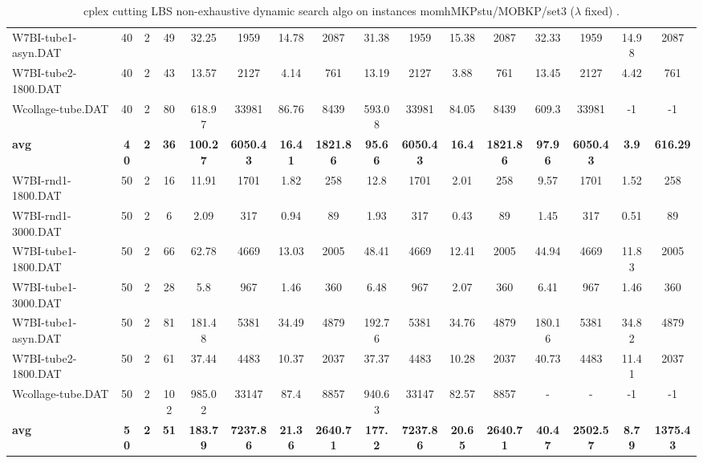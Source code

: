 \begin{sidewaystable}[!ht]
{\begin{tabular}{lccccccccccccccc}
W7BI-tube1-asyn.DAT & 40 & 2 & 49 & 32.25 & 1959 &  \textcolor{blue2}{14.78} & 2087 & 31.38 & 1959 & 15.38 & 2087 & 32.33 & 1959 & 14.98 & 2087 \\
W7BI-tube2-1800.DAT & 40 & 2 & 43 & 13.57 & 2127 & 4.14 & 761 & 13.19 & 2127 &  \textcolor{blue2}{3.88} & 761 & 13.45 & 2127 & 4.42 & 761 \\
Wcollage-tube.DAT & 40 & 2 & 80 & 618.97 & 33981 & 86.76 & 8439 & 593.08 & 33981 &  \textcolor{blue2}{84.05} & 8439 & 609.3 & 33981 & -1 & -1 \\
\cline{1-16} \textbf{avg} & \textbf{40} & \textbf{2} & \textbf{36} & \textbf{100.27} & \textbf{6050.43} & \textbf{16.41} & \textbf{1821.86} & \textbf{95.66} & \textbf{6050.43} & \textbf{16.4} & \textbf{1821.86} & \textbf{97.96} & \textbf{6050.43} & \textbf{3.9} & \textbf{616.29} \\ \cline{1-16}
W7BI-rnd1-1800.DAT & 50 & 2 & 16 & 11.91 & 1701 & 1.82 & 258 & 12.8 & 1701 & 2.01 & 258 & 9.57 & 1701 &  \textcolor{blue2}{1.52} & 258 \\
W7BI-rnd1-3000.DAT & 50 & 2 & 6 & 2.09 & 317 & 0.94 & 89 & 1.93 & 317 &  \textcolor{blue2}{0.43} & 89 & 1.45 & 317 & 0.51 & 89 \\
W7BI-tube1-1800.DAT & 50 & 2 & 66 & 62.78 & 4669 & 13.03 & 2005 & 48.41 & 4669 & 12.41 & 2005 & 44.94 & 4669 &  \textcolor{blue2}{11.83} & 2005 \\
W7BI-tube1-3000.DAT & 50 & 2 & 28 & 5.8 & 967 &  \textcolor{blue2}{1.46} & 360 & 6.48 & 967 & 2.07 & 360 & 6.41 & 967 &  \textcolor{blue2}{1.46} & 360 \\
W7BI-tube1-asyn.DAT & 50 & 2 & 81 & 181.48 & 5381 &  \textcolor{blue2}{34.49} & 4879 & 192.76 & 5381 & 34.76 & 4879 & 180.16 & 5381 & 34.82 & 4879 \\
W7BI-tube2-1800.DAT & 50 & 2 & 61 & 37.44 & 4483 & 10.37 & 2037 & 37.37 & 4483 &  \textcolor{blue2}{10.28} & 2037 & 40.73 & 4483 & 11.41 & 2037 \\
Wcollage-tube.DAT & 50 & 2 & 102 & 985.02 & 33147 & 87.4 & 8857 & 940.63 & 33147 &  \textcolor{blue2}{82.57} & 8857 &  - &  - & -1 & -1 \\
\cline{1-16} \textbf{avg} & \textbf{50} & \textbf{2} & \textbf{51} & \textbf{183.79} & \textbf{7237.86} & \textbf{21.36} & \textbf{2640.71} & \textbf{177.2} & \textbf{7237.86} & \textbf{20.65} & \textbf{2640.71} & \textbf{40.47} & \textbf{2502.57} & \textbf{8.79} & \textbf{1375.43} \\ \cline{1-16}
\bottomrule
\end{tabular}
}%
\caption{cplex cutting LBS non-exhaustive dynamic search algo on instances momhMKPstu/MOBKP/set3 ($\lambda$ fixed) .}
\label{tab:table_lambda_dynamic_momhMKPstu/MOBKP/set3 }
\end{sidewaystable}
